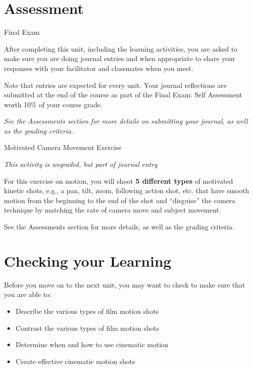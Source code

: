 \documentclass[
]{book}
\providecommand{\tightlist}{%
  \setlength{\itemsep}{0pt}\setlength{\parskip}{0pt}}
\begin{document}
\hypertarget{assessment-5}{%
\section*{Assessment}\label{assessment-5}}

\begin{assessment}
{Final Exam}

After completing this unit, including the learning activities, you are asked to make sure you are doing journal entries and when appropriate to share your responses with your facilitator and classmates when you meet.

Note that entries are expected for every unit. Your journal reflections are submitted at the end of the course as part of the Final Exam: Self Assessment worth 10\% of your course grade.

\emph{See the Assessments section for more details on submitting your journal, as well as the grading criteria.}

{Motivated Camera Movement Exercise}

\emph{This activity is ungraded, but part of journal entry}

For this exercise on motion, you will shoot \textbf{5 different types} of motivated kinetic shots, e.g., a pan, tilt, zoom, following action shot, etc. that have smooth motion from the beginning to the end of the shot and ``disguise'' the camera technique by matching the rate of camera move and subject movement.

See the Assessments section for more details, as well as the grading criteria.
\end{assessment}

\hypertarget{checking-your-learning-3}{%
\section*{Checking your Learning}\label{checking-your-learning-3}}

\begin{progress}
Before you move on to the next unit, you may want to check to make sure that you are able to:

\begin{itemize}
\tightlist
\item
  Describe the various types of film motion shots
\item
  Contrast the various types of film motion shots
\item
  Determine when and how to use cinematic motion
\item
  Create effective cinematic motion shots
\end{itemize}
\end{progress}
\end{document}
